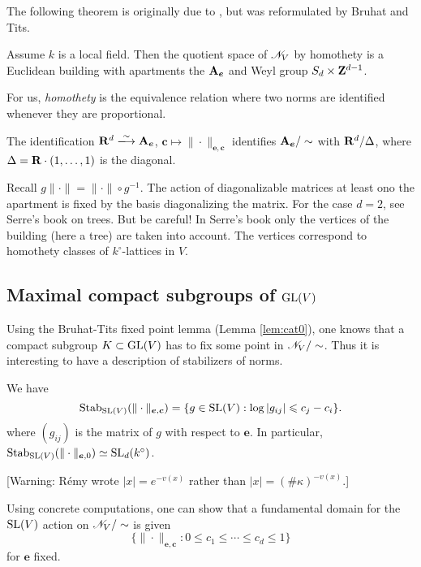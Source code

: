 \documentclass{article}
\begin{document}
The following theorem is originally due to \cite{gi63}, but was reformulated by 
Bruhat and Tits. 

\begin{theorem}
Assume $k$ is a local field. Then 
the quotient space of $\mathscr{N}_V$ by homothety is a Euclidean building with 
apartments the $\mathbf{A}_{\boldsymbol e}$ and Weyl 
group $S_d\times \mathbf{Z}^{d-1}$. 
\end{theorem}

For us, \emph{homothety} is the equivalence relation where two norms are identified 
whenever they are proportional. 

The identification $\dR^d\isomorphism \dA_{\boldsymbol e}$, 
$\boldsymbol c\mapsto \|\cdot\|_{\boldsymbol e,\boldsymbol c}$ identifies 
$\mathbf{A}_{\boldsymbol e}/\sim$ with $\mathbf{R}^d/\Delta$, where 
$\Delta=\mathbf{R}\cdot (1,\dots,1)$ is the diagonal. 

Recall $g \|\cdot\| = \|\cdot\|\circ g^{-1}$. The action of diagonalizable matrices at 
least ono the apartment is fixed by the basis diagonalizing the matrix. For the case 
$d=2$, see Serre's book on trees. But be careful! In Serre's book only the vertices 
of the building (here a tree) are taken into account. The vertices correspond 
to homothety classes of $k^\circ$-lattices in $V$. 


\subsection{Maximal compact subgroups of \texorpdfstring{$\operatorname{GL}(V)$}{GL(V)}}

Using the Bruhat-Tits fixed point lemma (Lemma \ref{lem:cat0}), one knows that a 
compact subgroup $K\subset \operatorname{GL}(V)$ has to fix some point in 
$\mathscr{N}_V/\sim$. Thus it is interesting to have a description of stabilizers of 
norms. 

\begin{proposition}
We have 
\[
  \operatorname{Stab}_{\operatorname{SL}(V)}(\|\cdot\|_{\boldsymbol e,\boldsymbol c}) = \{g\in \operatorname{SL}(V): \log |g_{i j}| \leqslant c_j - c_i\} .
\]
where $(g_{i j})$ is the matrix of $g$ with respect to $\boldsymbol e$. 
In particular, $\operatorname{Stab}_{\operatorname{SL}(V)}(\|\cdot\|_{\boldsymbol e,0}) \simeq \operatorname{SL}_d(k^\circ)$. 
\end{proposition}

[Warning: R\'emy wrote $|x|=e^{-v(x)}$ rather than 
$|x|=(\# \kappa)^{-v(x)}$.] 

Using concrete computations, one can show that a fundamental domain for the 
$\operatorname{SL}(V)$ action on $\mathscr{N}_V/\sim$ is given 
\[
  \{\|\cdot\|_{\boldsymbol e,\boldsymbol c}:0\leqslant c_1 \leqslant \cdots \leqslant c_d \leqslant 1\} 
\]
for $\boldsymbol e$ fixed. 
\end{document}
